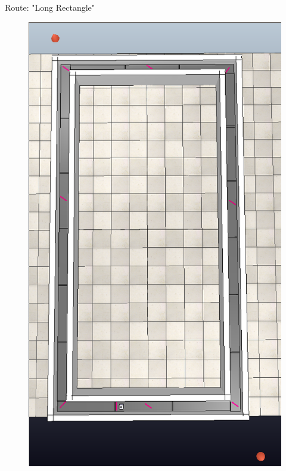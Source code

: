 \documentclass[10pt]{beamer}
\begin{document}
\begin{frame}{Route: "Long Rectangle"}
    \begin{figure}
        \centering
        \includegraphics[angle=90,width=\linewidth]{long_rectangle.png}
    \end{figure}
\end{frame}
\end{document}
